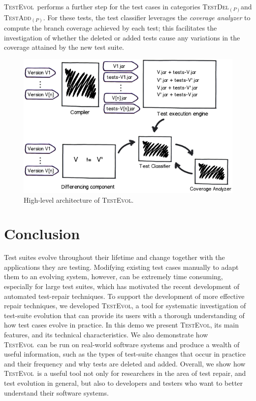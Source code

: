 \documentclass[conference]{IEEEtran}
\newcommand{\mt}{\mathit}
\newcommand{\catdelp}{\textsc{TestDel}$_\mt{(P)}$}
\newcommand{\cataddp}{\textsc{TestAdd}$_\mt{(P)}$}
\newcommand{\tool}{\textsc{TestEvol}\xspace}
\begin{document}
\tool\ performs a further step for the test cases in categories
\catdelp{}and \cataddp{}. For these tests, the test classifier
leverages the \emph{coverage analyzer} to compute the branch coverage
achieved by each test; this facilitates the investigation of whether
the deleted or added tests cause any variations in the coverage
attained by the new test suite.

\begin{figure}
	\centering
	\includegraphics[width=\columnwidth]{architecture.png}
        \vspace*{-16pt}
	\caption{High-level architecture of \tool.}
        \vspace*{-8pt}
	\label{fig:trex}
\end{figure}

\vspace*{-8pt}
\section{Conclusion}
\label{sec:summary}

Test suites evolve throughout their lifetime and change together with
the applications they are testing. Modifying existing test cases
manually to adapt them to an evolving system, however, can be
extremely time consuming, especially for large test suites, which has
motivated the recent development of automated test-repair techniques.
To support the development of more effective repair techniques, we
developed \tool, a tool for systematic investigation of test-suite
evolution that can provide its users with a thorough understanding of
how test cases evolve in practice. In this demo we present \tool, its
main features, and its technical characteristics. We also demonstrate
how \tool\ can be run on real-world software systems and produce a
wealth of useful information, such as the types of test-suite changes
that occur in practice and their frequency and why tests are deleted
and added.  Overall, we show how \tool\ is a useful tool not only for
researchers in the area of test repair, and test evolution in general,
but also to developers and testers who want to better understand their
software systems.





\end{document}
